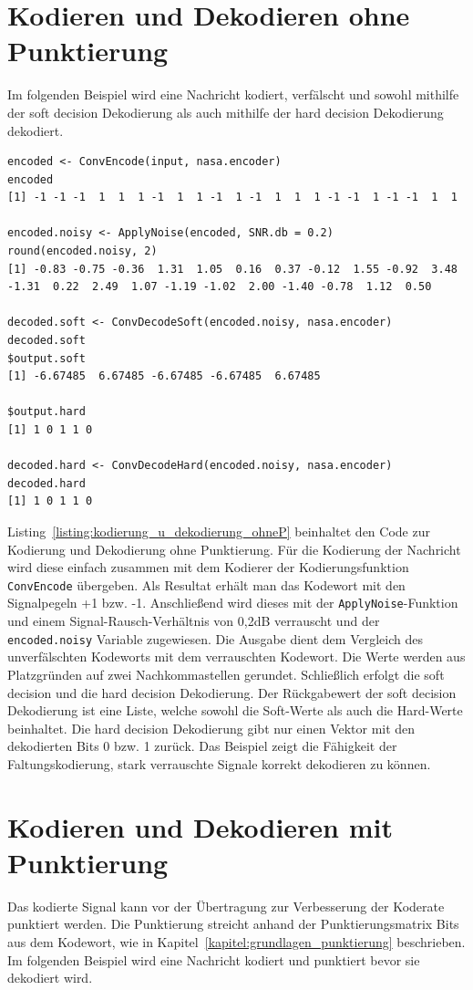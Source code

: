 \section{Kodieren und Dekodieren ohne Punktierung}
\label{kapitel:beispiele_kodieren_ohneP}
Im folgenden Beispiel wird eine Nachricht kodiert, verfälscht und sowohl mithilfe der soft decision Dekodierung als auch mithilfe der hard decision Dekodierung dekodiert.

\begin{lstlisting}[caption=Kodierung und Dekodierung ohne Punktierung, label={listing:kodierung_u_dekodierung_ohneP}, float=!tbh]
encoded <- ConvEncode(input, nasa.encoder)
encoded
[1] -1 -1 -1  1  1  1 -1  1  1 -1  1 -1  1  1  1 -1 -1  1 -1 -1  1  1
 
encoded.noisy <- ApplyNoise(encoded, SNR.db = 0.2)
round(encoded.noisy, 2)
[1] -0.83 -0.75 -0.36  1.31  1.05  0.16  0.37 -0.12  1.55 -0.92  3.48 -1.31  0.22  2.49  1.07 -1.19 -1.02  2.00 -1.40 -0.78  1.12  0.50

decoded.soft <- ConvDecodeSoft(encoded.noisy, nasa.encoder)
decoded.soft
$output.soft
[1] -6.67485  6.67485 -6.67485 -6.67485  6.67485

$output.hard
[1] 1 0 1 1 0

decoded.hard <- ConvDecodeHard(encoded.noisy, nasa.encoder)
decoded.hard
[1] 1 0 1 1 0
\end{lstlisting}

Listing~\ref{listing:kodierung_u_dekodierung_ohneP} beinhaltet den Code zur Kodierung und Dekodierung ohne Punktierung. Für die Kodierung der Nachricht wird diese einfach zusammen mit dem Kodierer der Kodierungsfunktion \texttt{ConvEncode} übergeben. Als Resultat erhält man das Kodewort mit den Signalpegeln +1 bzw. -1. Anschließend wird dieses mit der \texttt{ApplyNoise}-Funktion und einem Signal-Rausch-Verhältnis von 0,2dB verrauscht und der \texttt{encoded.noisy} Variable zugewiesen. Die Ausgabe dient dem Vergleich des unverfälschten Kodeworts mit dem verrauschten Kodewort. Die Werte werden aus Platzgründen auf zwei Nachkommastellen gerundet. Schließlich erfolgt die soft decision und die hard decision Dekodierung. Der Rückgabewert der soft decision Dekodierung ist eine Liste, welche sowohl die Soft-Werte als auch die Hard-Werte beinhaltet. Die hard decision Dekodierung gibt nur einen Vektor mit den dekodierten Bits 0 bzw. 1 zurück. Das Beispiel zeigt die Fähigkeit der Faltungskodierung, stark verrauschte Signale korrekt dekodieren zu können.

\section{Kodieren und Dekodieren mit Punktierung}
\label{kapitel:beispiele_kodieren_mitP}
Das kodierte Signal kann vor der Übertragung zur Verbesserung der Koderate punktiert werden. Die Punktierung streicht anhand der Punktierungsmatrix Bits aus dem Kodewort, wie in Kapitel~\ref{kapitel:grundlagen_punktierung} beschrieben. Im folgenden Beispiel wird eine Nachricht kodiert und punktiert bevor sie dekodiert wird.

